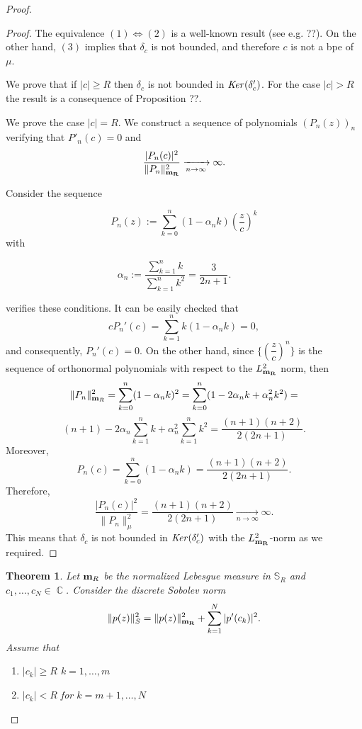 \documentclass[12pt]{amsart}
\theoremstyle{definition}
\theoremstyle{plain}
\newtheorem{theorem}{Theorem}
\theoremstyle{remark}
\DeclareMathOperator{\CC}{\mathbb C}
\begin{document}
\begin{proof}
\begin{proof} The equivalence $(1) \Leftrightarrow (2)$ is a well-known result (see e.g. ??). On the other hand, $(3)$ implies that $\delta_c$ is not bounded, and therefore $c$ is not a bpe of $\mu$. 


\noindent We prove that if 
$\vert c \vert \geq R$ then $\delta_c$ is not bounded in ${\it Ker}(\delta'_c)$. For the case $\vert c \vert >R$ the result is a consequence of Proposition ??. 

\noindent We prove the case $\vert c \vert =R$. 
	We construct a sequence of polynomials $(P_n(z))_n$ verifying that $P'_n(c)=0$ and 
\[
		\frac{|P_n(c)|^2}{\|P_n\|_{\bf{m_R}}^2}
		\xrightarrow[n\to\infty]{}\infty.
	\]



\noindent Consider the sequence 

    
  $$
  P_n(z):=\sum_{k=0}^{n}(1-\alpha_n k)\left(\frac{z}{c}\right)^k  
$$
\noindent with 

    \[
		\alpha_n:=\frac{\sum_{k=1}^{n}k}{\sum_{k=1}^{n}k^2}=\frac{3}{2n+1}.
		\qquad
	\]

    \noindent verifies these conditions. It can be easily checked that 
	\[
		cP_n'(c)=\sum_{k=1}^{n}k(1-\alpha_n k)=0,
	\]
	\noindent and consequently, $P_n'(c)=0$. On the other hand, since $\{\left(\dfrac{z}{c}\right)^n\}$ is the sequence of orthonormal polynomials with respect to the $L^{2}_{\bf m_R}$ norm, then 
	$$
		\|P_n\|_{{\bf m}_R}^2=
		\sum_{k=0}^{n}(1-\alpha_n k)^2
	=\sum_{k=0}^n (1-2\alpha_n k + \alpha_n^2k^2)=
$$
$$   
(n+1)-2\alpha_n\sum_{k=1}^{n}k+\alpha_n^2\sum_{k=1}^{n}k^2
		=\frac{(n+1)(n+2)}{2(2n+1)}.
	$$
	Moreover,
	\[
		P_n(c)=\sum_{k=0}^{n}(1-\alpha_n k)
		=\frac{(n+1)(n+2)}{2(2n+1)}.
	\]
	\noindent Therefore, 
	\[
		\frac{|P_n(c)|^2}{\|P_n\|_{\mu}^2}
		=
		\frac{(n+1)(n+2)}{2(2n+1)}
		\xrightarrow[n\to\infty]{}\infty.
	\]
	\noindent This means that $\delta_c$ is not bounded in ${\it Ker}(\delta'_c)$ with the $L^{2}_{{\bf m
    _R}}$-norm as we required. 
    
    
    
    

\end{proof}




\begin{theorem} Let  ${\bf m}_R$ be the normalized Lebesgue measure in $\mathbb{S}_R$ and $c_1,\dots,c_N\in \CC$. Consider the discrete Sobolev norm 
$$
\Vert p(z) \Vert^2_S=\Vert p(z) \Vert^2_{\bf m_R}+\sum_{k=1}^{N} \vert p'(c_k)\vert^2.
$$
\noindent Assume that 
\begin{enumerate}
    \item $\vert c_k \vert \geq R $ $k=1,\dots,m$ 
    \item $\vert c_k \vert <R$ for $k=m+1,\dots,N$    
\end{enumerate}


\end{theorem}
\end{proof}
\end{document}
